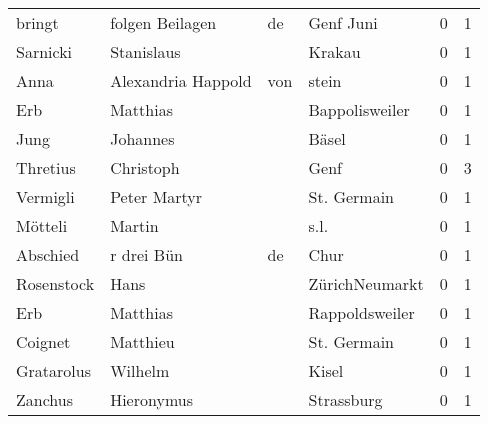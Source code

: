 \begin{tabular}{llllrr}
                   bringt &                    folgen Beilagen &          de &                                   Genf Juni &          0 &         1 \\
                 Sarnicki &                         Stanislaus &             &                                      Krakau &          0 &         1 \\
                     Anna &                Alexandria  Happold &         von &                                       stein &          0 &         1 \\
                      Erb &                           Matthias &             &                              Bappolisweiler &          0 &         1 \\
                     Jung &                           Johannes &             &                                       Bäsel &          0 &         1 \\
                 Thretius &                          Christoph &             &                                        Genf &          0 &         3 \\
                 Vermigli &                       Peter Martyr &             &                                 St. Germain &          0 &         1 \\
                  Mötteli &                             Martin &             &                                        s.l. &          0 &         1 \\
                 Abschied &                         r drei Bün &          de &                                        Chur &          0 &         1 \\
               Rosenstock &                               Hans &             &                              ZürichNeumarkt &          0 &         1 \\
                      Erb &                           Matthias &             &                              Rappoldsweiler &          0 &         1 \\
                  Coignet &                           Matthieu &             &                                 St. Germain &          0 &         1 \\
               Gratarolus &                            Wilhelm &             &                                       Kisel &          0 &         1 \\
                  Zanchus &                         Hieronymus &             &                                  Strassburg &          0 &         1 \\

\end{tabular}
